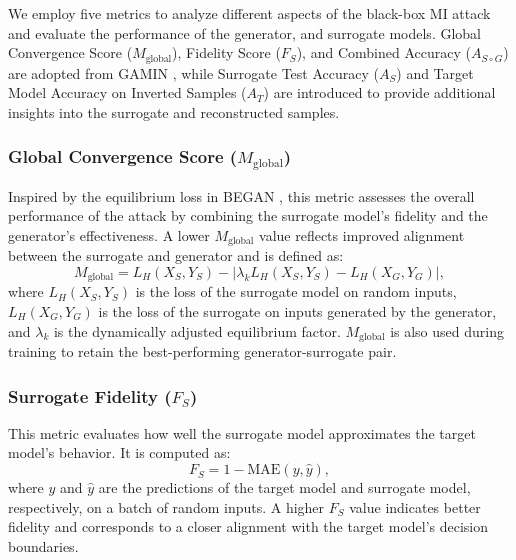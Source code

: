 We employ five metrics to analyze different aspects of the black-box MI attack and evaluate the performance of the generator, and surrogate models.
Global Convergence Score (\(M_{\text{global}}\)), Fidelity Score (\(F_S\)), and Combined Accuracy (\(A_{S \circ G}\)) are adopted from GAMIN \cite{aivodji2019gamin}, while Surrogate Test Accuracy (\(A_S\)) and Target Model Accuracy on Inverted Samples (\(A_T\)) are introduced to provide additional insights into the surrogate and reconstructed samples.


\subsubsection{Global Convergence Score (\(M_{\text{global}}\))}
Inspired by the equilibrium loss in BEGAN \cite{berthelot2017began}, this metric assesses the overall performance of the attack by combining the surrogate model's fidelity and the generator’s effectiveness. A lower \(M_{\text{global}}\) value reflects improved alignment between the surrogate and generator and is defined as:
\begin{equation}
    M_{\text{global}} = L_H(X_S, Y_S) - |\lambda_k L_H(X_S, Y_S) - L_H(X_G, Y_G)|,
\end{equation}
where \(L_H(X_S, Y_S)\) is the loss of the surrogate model on random inputs, \(L_H(X_G, Y_G)\) is the loss of the surrogate on inputs generated by the generator, and \(\lambda_k\) is the dynamically adjusted equilibrium factor. \(M_{\text{global}}\) is also used during training to retain the best-performing generator-surrogate pair.







\subsubsection{Surrogate Fidelity (\(F_S\))} This metric evaluates how well the surrogate model approximates the target model’s behavior. It is computed as:
\begin{equation}
    F_S = 1 - \text{MAE}(y, \hat{y}),
\end{equation}
where \(y\) and \(\hat{y}\) are the predictions of the target model and surrogate model, respectively, on a batch of random inputs. A higher \(F_S\) value indicates better fidelity and corresponds to a closer alignment with the target model’s decision boundaries.

